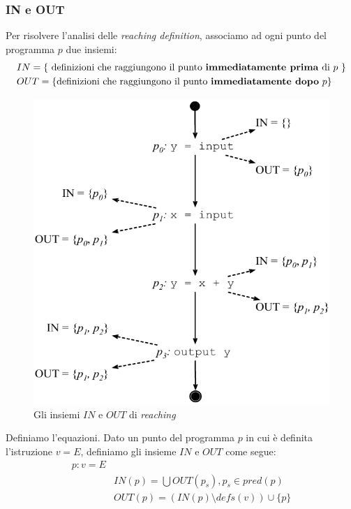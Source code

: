 \subsubsection{IN e OUT}
Per risolvere l'analisi delle \textit{reaching definition}, associamo ad ogni
punto del programma $p$ due insiemi:
\begin{align*}
& IN = \{
\text{
definizioni che raggiungono il punto \textbf{immediatamente prima} di $p$
}
\} \\
& OUT = \{
\text{definizioni che raggiungono il punto \textbf{immediatamente dopo} $p$}
\}
\end{align*}

\begin{figure}[H]
  \centering
  \includegraphics[scale=0.4]{res/image/in_out_reaching}
  \caption{Gli insiemi $IN$ e $OUT$ di \textit{reaching}}
  \label{img:in_out_reaching}
\end{figure}

Definiamo l'equazioni. Dato un punto del programma $p$ in cui \`e definita
l'istruzione $v = E$, definiamo gli insieme $IN$ e $OUT$ come segue:
\begin{align*}
p: v = E &                                                   \\
         & IN(p) = \bigcup OUT(p_s), p_s \in pred(p)         \\
         & OUT(p) = (IN(p) \setminus defs(v)) \cup \{p\}
\end{align*}

